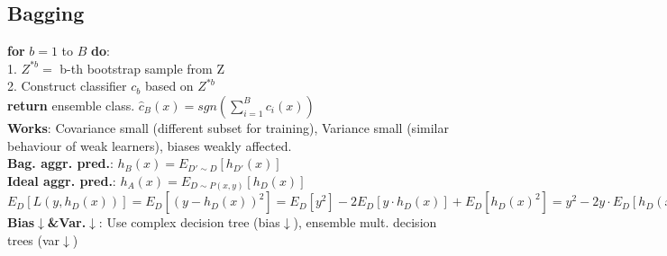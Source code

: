 \subsection*{Bagging}
\textbf{for} $b=1$ to $B$ \textbf{do}:\\
1. $Z^{*b}=$ b-th bootstrap sample from Z\\
2. Construct classifier $c_b$ based on $Z^{*b}$\\
\textbf{return} ensemble class. $\hat{c}_B(x)=sgn(\sum_{i=1}^{B} c_i(x))$\\
\textbf{Works}: Covariance small (different subset for training), Variance small (similar behaviour of weak learners), biases weakly affected.\\
\textbf{Bag. aggr. pred.}: $h_B(x)=E_{D'\sim D}[h_{D'}(x)]$\\
\textbf{Ideal aggr. pred.}: $h_A(x)=E_{D\sim P(x,y)}[h_D(x)]$\\
$E_D[L(y,h_D(x))]=E_D[(y-h_D(x))^2]=E_D[y^2]-2E_D[y\cdot h_D(x)]+E_D[h_D(x)^2]=y^2-2y\cdot E_D[h_D(x)]+E_D[h_D(x)^2]\geq y^2-2y\cdot E_D[h_D(x)]+E_D[h_D(x)]^2=y^2-2y\cdot h_A(x)+h_A(x)^2=(y-h_A(x))^2=L(y,h_A(x))$\\
\textbf{Bias$\downarrow$\&Var.$\downarrow$}: Use complex decision tree (bias$\downarrow$), ensemble mult. decision trees (var$\downarrow$)
